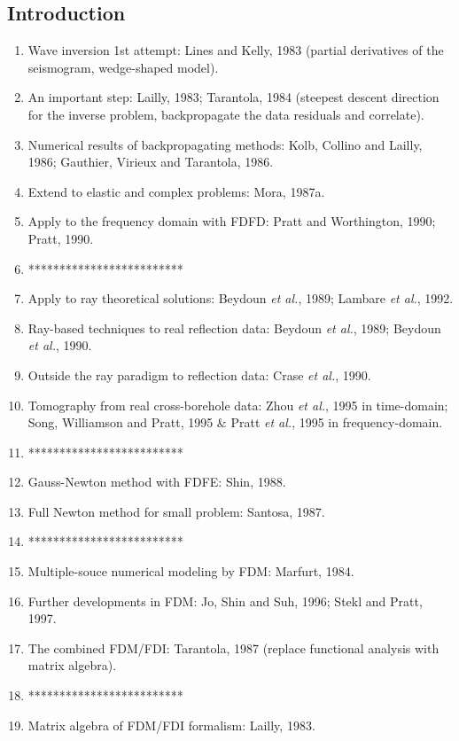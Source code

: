 \documentclass{article}
\newcommand{\sline}{*************************}
\newcommand{\etal}{\textit{et al.}}
\begin{document}
\subsection{Introduction}
\begin{enumerate}[\hspace{10mm}*]
  \item Wave inversion 1st attempt: Lines and Kelly, 1983 (partial derivatives of the seismogram, wedge-shaped model).
  \item An important step: Lailly, 1983; Tarantola, 1984 (steepest descent direction for the inverse problem, backpropagate the data residuals and correlate).
  \item Numerical results of backpropagating methods: Kolb, Collino and Lailly, 1986; Gauthier, Virieux and Tarantola, 1986.
  \item Extend to elastic and complex problems: Mora, 1987a.
  \item Apply to the frequency domain with FDFD: Pratt and Worthington, 1990; Pratt, 1990.
  \item \sline
  \item Apply to ray theoretical solutions: Beydoun \etal, 1989; Lambare \etal, 1992.
  \item Ray-based techniques to real reflection data: Beydoun \etal, 1989; Beydoun \etal, 1990.
  \item Outside the ray paradigm to reflection data: Crase \etal, 1990.
  \item Tomography from real cross-borehole data: Zhou \etal, 1995 in time-domain; Song, Williamson and Pratt, 1995 \& Pratt \etal, 1995 in frequency-domain.
  \item \sline
  \item Gauss-Newton method with FDFE: Shin, 1988.
  \item Full Newton method for small problem: Santosa, 1987.
  \item \sline
  \item Multiple-souce numerical modeling by FDM: Marfurt, 1984.
  \item Further developments in FDM: Jo, Shin and Suh, 1996; Stekl and Pratt, 1997.
  \item The combined FDM/FDI: Tarantola, 1987 (replace functional analysis with matrix algebra).
  \item \sline
  \item Matrix algebra of FDM/FDI formalism: Lailly, 1983.
\end{enumerate}\par
\end{document}
